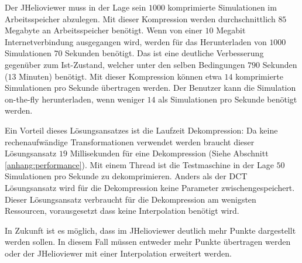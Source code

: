 Der JHelioviewer muss in der Lage sein $1000$ komprimierte Simulationen im Arbeitsspeicher abzulegen. Mit dieser Kompression werden durchschnittlich $85$ Megabyte an Arbeitsspeicher benötigt. Wenn von einer $10$ Megabit Internetverbindung ausgegangen wird, werden für das Herunterladen von $1000$ Simulationen $70$ Sekunden benötigt. Das ist eine deutliche Verbesserung gegenüber zum Ist-Zustand, welcher unter den selben Bedingungen $790$ Sekunden ($13$ Minuten) benötigt. Mit dieser Kompression können etwa $14$ komprimierte Simulationen pro Sekunde übertragen werden. Der Benutzer kann die Simulation on-the-fly herunterladen, wenn weniger $14$ als Simulationen pro Sekunde benötigt werden.

Ein Vorteil dieses Lösungsansatzes ist die Laufzeit Dekompression: Da keine rechenaufwändige Transformationen verwendet werden braucht dieser Lösungsansatz $19$ Millisekunden für eine Dekompression (Siehe Abschnitt \ref{anhang:performance}). Mit einem Thread ist die Testmaschine in der Lage $50$ Simulationen pro Sekunde zu dekomprimieren. Anders als der DCT Lösungsansatz wird für die Dekompression keine Parameter zwischengespeichert. Dieser Lösungsansatz verbraucht für die Dekompression am wenigsten Ressourcen, vorausgesetzt dass keine Interpolation benötigt wird.

In Zukunft ist es möglich, dass im JHelioviewer deutlich mehr Punkte dargestellt werden sollen. In diesem Fall müssen entweder mehr Punkte übertragen werden oder der JHelioviewer mit einer Interpolation erweitert werden.
